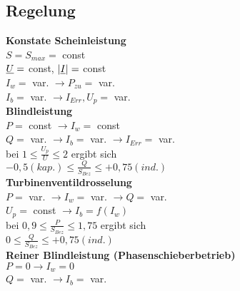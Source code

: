 \subsection{Regelung}

\textbf{Konstate Scheinleistung}\\
\indent $S = S_{max} =$ const\\
\indent $\underline{U}=$ const, $|\underline{I}| =$ const\\
\indent $I_w =$ var. $\rightarrow P_{zu}=$ var.\\
\indent $I_b =$ var. $\rightarrow I_{Err}, U_p =$ var.\\

\textbf{Blindleistung}\\
\indent $P =$ const $\rightarrow I_w= $ const\\
\indent $Q =$ var. $\rightarrow I_b = $ var. $\rightarrow I_{Err}=$ var.\\
\indent bei $1 \leq \frac{U_p}{U} \leq 2$ ergibt sich \\
\indent $-0,5 (kap.) \leq \frac{Q}{S_{Bez}} \leq +0,75(ind.)$\\

\textbf{Turbinenventildrosselung}\\
\indent $P =$ var. $\rightarrow I_w= $ var. $\rightarrow Q =$ var.\\
\indent $U_p =$ const $\rightarrow I_b = f(I_w)$\\
\indent bei $0,9 \leq \frac{P}{S_{Bez}} \leq 1,75$ ergibt sich\\
\indent $0 \leq \frac{Q}{S_{Bez}} \leq +0,75(ind.)$\\

\textbf{Reiner Blindleistung (Phasenschieberbetrieb)}\\
\indent $P = 0 \rightarrow I_w= 0$ \\
\indent $Q =$ var. $\rightarrow I_b = $ var.

